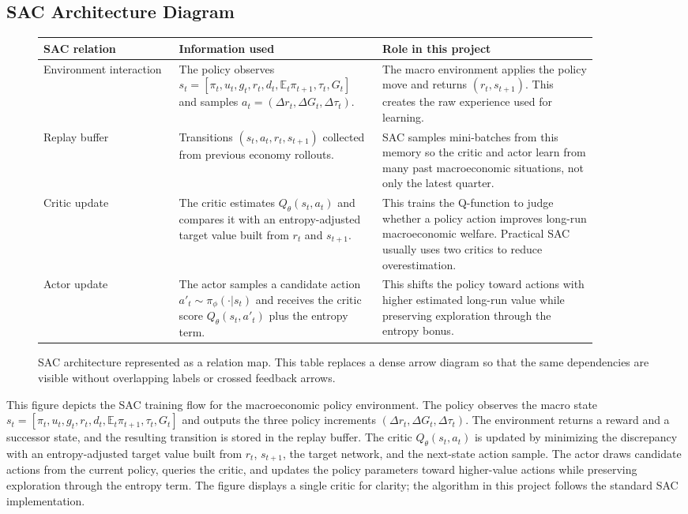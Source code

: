 \documentclass[11pt]{article}
\begin{document}
\subsection{SAC Architecture Diagram}
\begin{figure}[ht]
\centering
\small
\begin{tabular}{
    >{\raggedright\arraybackslash}p{0.22\linewidth}
    >{\raggedright\arraybackslash}p{0.33\linewidth}
    >{\raggedright\arraybackslash}p{0.35\linewidth}
}
\toprule
\textbf{SAC relation} & \textbf{Information used} & \textbf{Role in this project} \\
\midrule
Environment interaction
&
The policy observes $s_t=[\pi_t,u_t,g_t,r_t,d_t,\mathbb{E}_t\pi_{t+1},\tau_t,G_t]$ and samples $a_t=(\Delta r_t,\Delta G_t,\Delta \tau_t)$.
&
The macro environment applies the policy move and returns $(r_t,s_{t+1})$. This creates the raw experience used for learning. \\
\midrule
Replay buffer
&
Transitions $(s_t,a_t,r_t,s_{t+1})$ collected from previous economy rollouts.
&
SAC samples mini-batches from this memory so the critic and actor learn from many past macroeconomic situations, not only the latest quarter. \\
\midrule
Critic update
&
The critic estimates $Q_\theta(s_t,a_t)$ and compares it with an entropy-adjusted target value built from $r_t$ and $s_{t+1}$.
&
This trains the Q-function to judge whether a policy action improves long-run macroeconomic welfare. Practical SAC usually uses two critics to reduce overestimation. \\
\midrule
Actor update
&
The actor samples a candidate action $a'_t\sim\pi_\phi(\cdot|s_t)$ and receives the critic score $Q_\theta(s_t,a'_t)$ plus the entropy term.
&
This shifts the policy toward actions with higher estimated long-run value while preserving exploration through the entropy bonus. \\
\bottomrule
\end{tabular}
\caption{SAC architecture represented as a relation map. This table replaces a dense arrow diagram so that the same dependencies are visible without overlapping labels or crossed feedback arrows.}
\end{figure}

This figure depicts the SAC training flow for the macroeconomic policy environment. The policy observes the macro state $s_t=[\pi_t,u_t,g_t,r_t,d_t,\mathbb{E}_t\pi_{t+1},\tau_t,G_t]$ and outputs the three policy increments $(\Delta r_t,\Delta G_t,\Delta \tau_t)$. The environment returns a reward and a successor state, and the resulting transition is stored in the replay buffer. The critic $Q_\theta(s_t,a_t)$ is updated by minimizing the discrepancy with an entropy-adjusted target value built from $r_t$, $s_{t+1}$, the target network, and the next-state action sample. The actor draws candidate actions from the current policy, queries the critic, and updates the policy parameters toward higher-value actions while preserving exploration through the entropy term. The figure displays a single critic for clarity; the algorithm in this project follows the standard SAC implementation.
\end{document}
